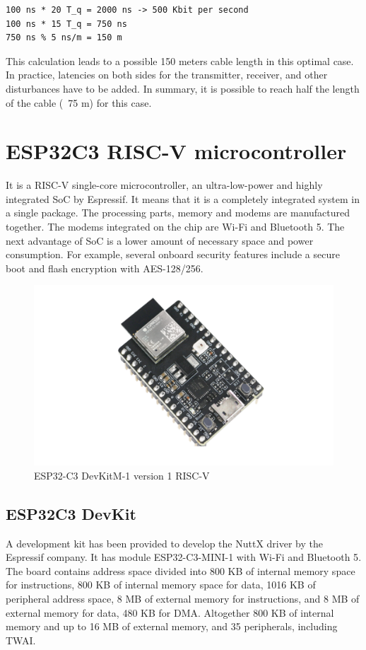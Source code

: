 \documentclass{ctuthesis}
\begin{document}
\begin{verbatim}
100 ns * 20 T_q = 2000 ns -> 500 Kbit per second
100 ns * 15 T_q = 750 ns
750 ns % 5 ns/m = 150 m
\end{verbatim}

 This calculation leads to a possible 150 meters cable length in this optimal case. In practice, latencies on both sides for the transmitter, receiver, and other disturbances have to be added. In summary, it is possible to reach half the length of the cable (~75 m) for this case.
 
\chapter{ESP32C3 RISC-V microcontroller}
\label{ch:esp32}
 It is a RISC-V single-core microcontroller, an ultra-low-power and highly integrated SoC by Espressif. It means that it is a completely integrated system in a single package. The processing parts, memory and modems are manufactured together. The modems integrated on the chip are Wi-Fi and Bluetooth 5. The next advantage of SoC is a lower amount of necessary space and power consumption.
 For example, several onboard security features include a secure boot and flash encryption with AES-128/256.

\begin{figure}[htb]
 \includegraphics[width=1\textwidth]{images/esp32-c3-devkitm-1-v1.pdf}
 \caption{ESP32-C3 DevKitM-1 version 1 RISC-V \cite{esp32c3-devkit}}
\end{figure}

 \section{ESP32C3 DevKit}
  A development kit has been provided to develop the NuttX driver by the Espressif company. It has module ESP32-C3-MINI-1 with Wi-Fi and Bluetooth 5\cite{esp32-c3-mcu}. The board contains address space divided into 800 KB of internal memory space for instructions, 800 KB of internal memory space for data, 1016 KB of peripheral address space, 8 MB of external memory for instructions, and 8 MB of external memory for data, 480 KB for DMA. Altogether 800 KB of internal memory and up to 16 MB of external memory, and 35 peripherals, including TWAI.
\end{document}
